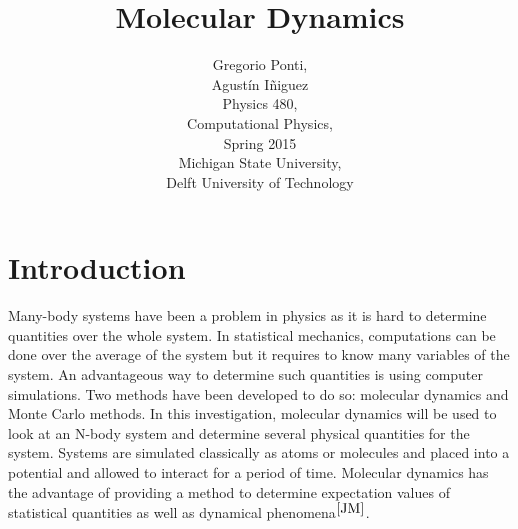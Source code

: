 \documentclass[letterpaper,12pt]{article}
\numberwithin{equation}{subsection}
\begin{document}
\title{\textbf{Molecular Dynamics}}
\author{Gregorio Ponti,\\
	Agust{\'in} I{\~n}iguez\\
	Physics 480, \\
	Computational Physics,\\
	Spring 2015\\
	Michigan State University, \\
	Delft University of Technology}
\maketitle

\newpage
\tableofcontents

\newpage
\section{Introduction}
Many-body systems have been a problem in physics as it is hard to determine quantities over the whole system. In statistical mechanics, computations can be done over the average of the system but it requires to know many variables of the system. An advantageous way to determine such quantities is using computer simulations. Two methods have been developed to do so: molecular dynamics and Monte Carlo methods. In this investigation, molecular dynamics will be used to look at an N-body system and determine several physical quantities for the system. Systems are simulated classically as atoms or molecules and placed into a potential and allowed to interact for a period of time. Molecular dynamics has the advantage of providing a method to determine expectation values of statistical quantities as well as dynamical phenomena$ ^{\cite{JM}}$.
\end{document}
